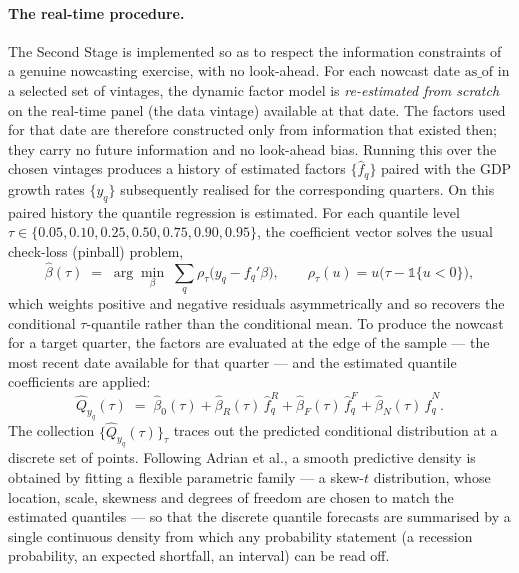 \documentclass[11pt, a4paper, oneside]{article}
\begin{document}
\paragraph{The real-time procedure.}
The Second Stage is implemented so as to respect the information
constraints of a genuine nowcasting exercise, with no look-ahead. For
each nowcast date $\mathrm{as\_of}$ in a selected set of vintages,
the dynamic factor model is \emph{re-estimated from scratch} on the
real-time panel (the data vintage) available at that date. The
factors used for that date are therefore constructed only from
information that existed then; they carry no future information and
no look-ahead bias. Running this over the chosen vintages produces a
history of estimated factors $\{\hat f_q\}$ paired with the GDP
growth rates $\{y_q\}$ subsequently realised for the corresponding
quarters. On this paired history the quantile regression is
estimated. For each quantile level $\tau \in \{0.05, 0.10, 0.25,
0.50, 0.75, 0.90, 0.95\}$, the coefficient vector solves the usual
check-loss (pinball) problem,
\[
\hat\beta(\tau)
\;=\;
\arg\min_{\beta}\;
\sum_{q}
\rho_\tau\!\big(y_q - f_q'\beta\big),
\qquad
\rho_\tau(u) = u\big(\tau - \mathbb{1}\{u < 0\}\big),
\]
which weights positive and negative residuals asymmetrically and so
recovers the conditional $\tau$-quantile rather than the conditional
mean. To produce the nowcast for a target quarter, the factors are
evaluated at the edge of the sample --- the most recent date
available for that quarter --- and the estimated quantile
coefficients are applied:
\[
\hat Q_{y_q}(\tau)
\;=\;
\hat\beta_0(\tau)
+ \hat\beta_R(\tau)\, \hat f^{R}_{q}
+ \hat\beta_F(\tau)\, \hat f^{F}_{q}
+ \hat\beta_N(\tau)\, \hat f^{N}_{q}.
\]
The collection $\{\hat Q_{y_q}(\tau)\}_\tau$ traces out the predicted
conditional distribution at a discrete set of points. Following
Adrian et al., a smooth predictive density is obtained by fitting a
flexible parametric family --- a skew-$t$ distribution, whose
location, scale, skewness and degrees of freedom are chosen to match
the estimated quantiles --- so that the discrete quantile forecasts
are summarised by a single continuous density from which any
probability statement (a recession probability, an expected
shortfall, an interval) can be read off.
\end{document}
